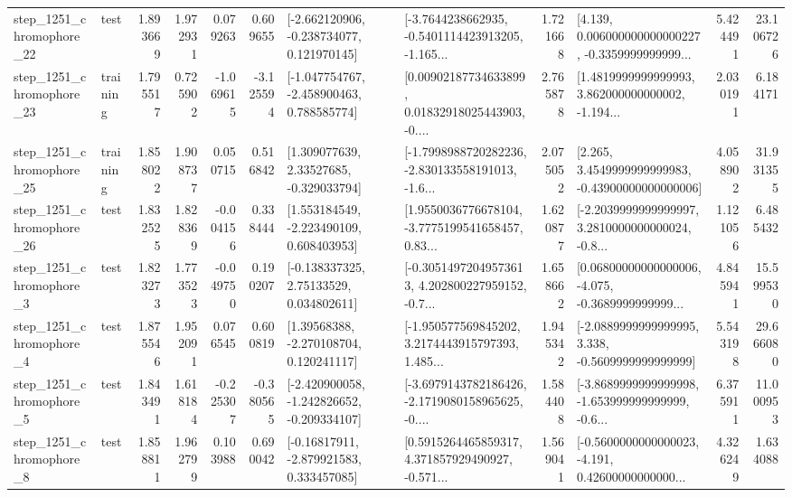\begin{tabular}{llrrrrllrlrr}
 step\_1251\_chromophore\_22 &      test &      1.893669 &    1.972931 &      0.079263 &  0.609655 &   [-2.662120906, -0.238734077, 0.121970145] &  [-3.7644238662935, -0.5401114423913205, -1.165... &       1.721668 &  [4.139, 0.006000000000000227, -0.3359999999999... &            5.424491 &         23.106726 \\
 step\_1251\_chromophore\_23 &  training &      1.795517 &    0.725902 &     -1.069615 & -3.125594 &   [-1.047754767, -2.458900463, 0.788585774] &  [0.00902187734633899, 0.01832918025443903, -0.... &       2.765878 &  [1.4819999999999993, 3.862000000000002, -1.194... &            2.030191 &          6.184171 \\
 step\_1251\_chromophore\_25 &  training &      1.858022 &    1.908737 &      0.050715 &  0.516842 &     [1.309077639, 2.33527685, -0.329033794] &  [-1.7998988720282236, -2.830133558191013, -1.6... &       2.075052 &  [2.265, 3.4549999999999983, -0.43900000000000006] &            4.058902 &         31.931355 \\
 step\_1251\_chromophore\_26 &      test &      1.832525 &    1.828369 &     -0.004156 &  0.338444 &    [1.553184549, -2.223490109, 0.608403953] &  [1.9550036776678104, -3.7775199541658457, 0.83... &       1.620877 &  [-2.2039999999999997, 3.2810000000000024, -0.8... &            1.121056 &          6.485432 \\
  step\_1251\_chromophore\_3 &      test &      1.823273 &    1.773523 &     -0.049750 &  0.190207 &     [-0.138337325, 2.75133529, 0.034802611] &  [-0.30514972049573613, 4.202800227959152, -0.7... &       1.658662 &  [0.06800000000000006, -4.075, -0.3689999999999... &            4.845941 &         15.599530 \\
  step\_1251\_chromophore\_4 &      test &      1.875546 &    1.952091 &      0.076545 &  0.600819 &     [1.39568388, -2.270108704, 0.120241117] &  [-1.950577569845202, 3.2174443915797393, 1.485... &       1.945342 &  [-2.0889999999999995, 3.338, -0.5609999999999999] &            5.543198 &         29.666080 \\
  step\_1251\_chromophore\_5 &      test &      1.843491 &    1.618184 &     -0.225307 & -0.380565 &  [-2.420900058, -1.242826652, -0.209334107] &  [-3.6979143782186426, -2.1719080158965625, -0.... &       1.584408 &  [-3.8689999999999998, -1.653999999999999, -0.6... &            6.375911 &         11.000953 \\
  step\_1251\_chromophore\_8 &      test &      1.858811 &    1.962799 &      0.103988 &  0.690042 &    [-0.16817911, -2.879921583, 0.333457085] &  [0.5915264465859317, 4.371857929490927, -0.571... &       1.569041 &  [-0.5600000000000023, -4.191, 0.42600000000000... &            4.326249 &          1.634088 \\

\end{tabular}
